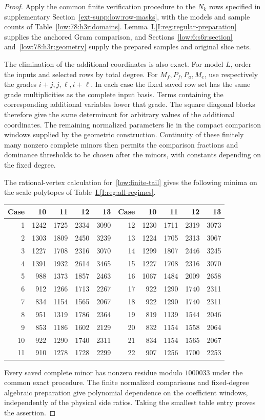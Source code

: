 \documentclass[11pt]{amsart}
\theoremstyle{definition}
\theoremstyle{remark}
\numberwithin{equation}{section}
\newcommand{\partIref}[1]{\hyperref[I:#1]{I.\ref*{I:#1}}}
\begin{document}
\begin{proof}
Apply the common finite verification procedure to the $N_k$ rows specified in supplementary Section~\ref{ext-supp:low:row-masks}, with the models and sample counts of Table~\ref{low:78:h3r:domains}. Lemma~\partIref{reg:regular-preparation} supplies the anchored Gram comparison, and Sections~\ref{low:6:s6r:section} and~\ref{low:78:h3r:geometry} supply the prepared samples and original slice nets.

The elimination of the additional coordinates is also exact. For model $L$, order the inputs and selected rows by total degree. For $M_f,P_f,P_a,M_e$, use respectively the grades $i+j,j,\ell,i+\ell$. In each case the fixed saved row set has the same grade multiplicities as the complete input basis. Terms containing the corresponding additional variables lower that grade. The square diagonal blocks therefore give the same determinant for arbitrary values of the additional coordinates. The remaining normalized parameters lie in the compact comparison windows supplied by the geometric construction. Continuity of these finitely many nonzero complete minors then permits the comparison fractions and dominance thresholds to be chosen after the minors, with constants depending on the fixed degree.

The rational-vertex calculation for~\eqref{low:finite-tail} gives the following minima on the scale polytopes of Table~\partIref{reg:all-regimes}.
\begin{center}\small
\begin{tabular}{r|rrrr@{\qquad}r|rrrr}
\toprule
Case&10&11&12&13&Case&10&11&12&13\\\midrule
1&1242&1725&2334&3090&12&1230&1711&2319&3073\\
2&1303&1809&2450&3239&13&1224&1705&2313&3067\\
3&1227&1708&2316&3070&14&1299&1807&2446&3245\\
4&1391&1932&2614&3465&15&1227&1708&2316&3070\\
5&988&1373&1857&2463&16&1067&1484&2009&2658\\
6&912&1266&1713&2267&17&922&1290&1740&2311\\
7&834&1154&1565&2067&18&922&1290&1740&2311\\
8&951&1319&1786&2364&19&819&1139&1544&2046\\
9&853&1186&1602&2129&20&832&1154&1558&2064\\
10&922&1290&1740&2311&21&834&1154&1565&2067\\
11&910&1278&1728&2299&22&907&1256&1700&2253\\\bottomrule
\end{tabular}
\end{center}

Every saved complete minor has nonzero residue modulo $1000033$ under the common exact procedure. The finite normalized comparisons and fixed-degree algebraic preparation give polynomial dependence on the coefficient windows, independently of the physical side ratios. Taking the smallest table entry proves the assertion.
\end{proof}
\end{document}
